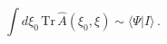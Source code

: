 \begin{equation}
\int d\xi _{0}\,\mathrm{Tr}\,\hat{A}(\xi _{0},\xi )\sim \langle \Psi
|I\rangle \,.
\end{equation}

